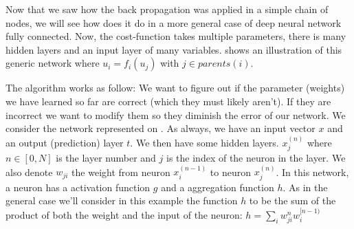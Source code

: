 	Now that we saw how the back propagation was applied in a simple chain of nodes, we will see how does it do in a more general case of deep neural network fully connected. Now, the cost-function takes multiple parameters, there is many hidden layers and an input layer of many variables.  shows an illustration of this generic network where $u_i = f_i(u_j)$ with $j \in parents(i)$.


	The algorithm works as follow:
	We want to figure out if the parameter (weights) we have learned so far are correct (which they must likely aren't). If they are incorrect we want to modify them so they diminish the error of our network. We consider the network represented on . As always, we have an input vector $x$ and an output (prediction) layer $t$. We then have some hidden layers. $x_j^{(n)}$ where $n \in [0,N]$ is the layer number and $j$ is the index of the neuron in the layer. We also denote $w_{ji}$ the weight from neuron $x_i^{(n-1)}$ to neuron $x_j^{(n)}$.
	In this network, a neuron has a activation function $g$ and a aggregation function $h$. As in the general case we'll consider in this example the function $h$ to be the sum of the product of both the weight and the input of the neuron: $h = \sum_i w_{ji}^n w_i^{[n-1)}$


